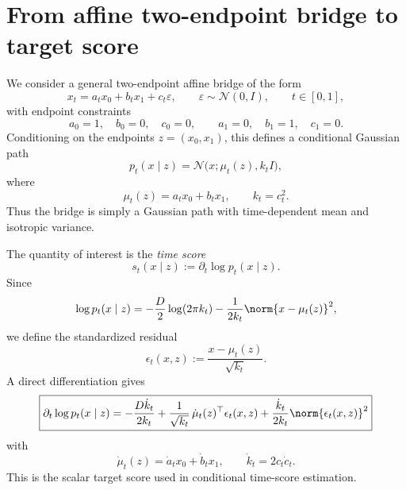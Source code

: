 \section{From affine two-endpoint bridge to target score}

We consider a general two-endpoint affine bridge of the form
\begin{equation}
x_t = a_t x_0 + b_t x_1 + c_t \varepsilon,
\qquad
\varepsilon \sim \mathcal N(0, I),
\qquad
t \in [0,1],
\end{equation}
with endpoint constraints
\begin{equation}
a_0 = 1,\quad b_0 = 0,\quad c_0 = 0,
\qquad
a_1 = 0,\quad b_1 = 1,\quad c_1 = 0.
\end{equation}
Conditioning on the endpoints $z=(x_0,x_1)$, this defines a conditional Gaussian path
\begin{equation}
p_t(x \mid z) = \mathcal N\!\bigl(x;\mu_t(z), k_t I\bigr),
\end{equation}
where
\begin{equation}
\mu_t(z) = a_t x_0 + b_t x_1,
\qquad
k_t = c_t^2.
\end{equation}
Thus the bridge is simply a Gaussian path with time-dependent mean and isotropic variance.

The quantity of interest is the \emph{time score}
\begin{equation}
s_t(x \mid z) := \partial_t \log p_t(x \mid z).
\end{equation}
Since
\begin{equation}
\log p_t(x \mid z)
=
-\frac{D}{2}\log(2\pi k_t)
-\frac{1}{2k_t}\norm{x-\mu_t(z)}^2,
\end{equation}
we define the standardized residual
\begin{equation}
\epsilon_t(x,z)
:=
\frac{x-\mu_t(z)}{\sqrt{k_t}}.
\end{equation}
A direct differentiation gives
\begin{equation}
\boxed{
\partial_t \log p_t(x \mid z)
=
-\frac{D \dot k_t}{2k_t}
+
\frac{1}{\sqrt{k_t}}\,\dot\mu_t(z)^\top \epsilon_t(x,z)
+
\frac{\dot k_t}{2k_t}\norm{\epsilon_t(x,z)}^2
}
\label{eq:scalar_time_score}
\end{equation}
with
\begin{equation}
\dot \mu_t(z) = \dot a_t x_0 + \dot b_t x_1,
\qquad
\dot k_t = 2 c_t \dot c_t.
\end{equation}
This is the scalar target score used in conditional time-score estimation.

